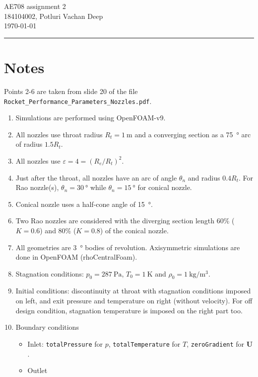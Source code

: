 \documentclass{article}
\newcommand{\vect}[1]{\ensuremath{\boldsymbol{\mathbf{#1}}}}
\begin{document}
\begin{center}
    {\Large AE708 assignment 2}\\[0.5em]
    {\large 184104002, Potluri Vachan Deep}\\[0.5em]
    {\today}
    \rule{\linewidth}{2pt}
\end{center}

\section*{Notes}
Points 2-6 are taken from slide \num{20} of the file \texttt{Rocket\_Performance\_Parameters\_Nozzles.pdf}.
\begin{enumerate}
    \item Simulations are performed using OpenFOAM-v9.
    \item All nozzles use throat radius $R_t = \SI{1}{\meter}$ and a converging section as a \SI{75}{\degree} arc of radius $1.5 R_t$.
    \item All nozzles use $\varepsilon = 4 = (R_e/R_t)^2$.
    \item Just after the throat, all nozzles have an arc of angle $\theta_n$ and radius $0.4 R_t$. For Rao nozzle(s), $\theta_n = \SI{30}{\degree}$ while $\theta_n = \SI{15}{\degree}$ for conical nozzle.
    \item Conical nozzle uses a half-cone angle of \SI{15}{\degree}.
    \item Two Rao nozzles are considered with the diverging section length 60\% ($K=0.6$) and 80\% ($K=0.8$) of the conical nozzle.
    \item All geometries are \SI{3}{\degree} bodies of revolution. Axisymmetric simulations are done in OpenFOAM (rhoCentralFoam).
    \item Stagnation conditions: $p_0 = \SI{287}{\pascal}$, $T_0 = \SI{1}{\kelvin}$ and $\rho_0 = \SI{1}{\kg\per\meter\cubed}$.
    \item Initial conditions: discontinuity at throat with stagnation conditions imposed on left, and exit pressure and temperature on right (without velocity). For off design condition, stagnation temperature is imposed on the right part too.
    \item Boundary conditions
    \begin{itemize}
        \item Inlet: \texttt{totalPressure} for $p$, \texttt{totalTemperature} for $T$, \texttt{zeroGradient} for $\vect{U}$.
        \item Outlet
        \begin{itemize}

\end{itemize}
\end{itemize}
\end{enumerate}
\end{document}
